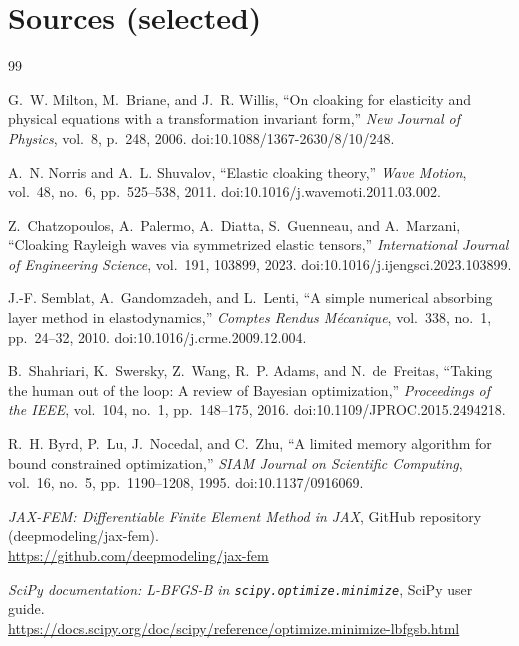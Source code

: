 \documentclass[11pt,a4paper]{report}
\begin{document}
\chapter{Sources (selected)}
\vspace{-0.5em}
\begin{thebibliography}{99}

G.~W. Milton, M.~Briane, and J.~R. Willis,
``On cloaking for elasticity and physical equations with a transformation invariant form,''
\emph{New Journal of Physics}, vol.~8, p.~248, 2006. doi:10.1088/1367-2630/8/10/248.

A.~N. Norris and A.~L. Shuvalov,
``Elastic cloaking theory,''
\emph{Wave Motion}, vol.~48, no.~6, pp.~525--538, 2011. doi:10.1016/j.wavemoti.2011.03.002.

Z.~Chatzopoulos, A.~Palermo, A.~Diatta, S.~Guenneau, and A.~Marzani,
``Cloaking Rayleigh waves via symmetrized elastic tensors,''
\emph{International Journal of Engineering Science}, vol.~191, 103899, 2023. doi:10.1016/j.ijengsci.2023.103899.

J.-F. Semblat, A.~Gandomzadeh, and L.~Lenti,
``A simple numerical absorbing layer method in elastodynamics,''
\emph{Comptes Rendus M\'ecanique}, vol.~338, no.~1, pp.~24--32, 2010. doi:10.1016/j.crme.2009.12.004.

B.~Shahriari, K.~Swersky, Z.~Wang, R.~P. Adams, and N.~de~Freitas,
``Taking the human out of the loop: A review of Bayesian optimization,''
\emph{Proceedings of the IEEE}, vol.~104, no.~1, pp.~148--175, 2016. doi:10.1109/JPROC.2015.2494218.

R.~H. Byrd, P.~Lu, J.~Nocedal, and C.~Zhu,
``A limited memory algorithm for bound constrained optimization,''
\emph{SIAM Journal on Scientific Computing}, vol.~16, no.~5, pp.~1190--1208, 1995. doi:10.1137/0916069.

\emph{JAX-FEM: Differentiable Finite Element Method in JAX}, GitHub repository (deepmodeling/jax-fem).\\
\url{https://github.com/deepmodeling/jax-fem}

\emph{SciPy documentation: L-BFGS-B in \texttt{scipy.optimize.minimize}}, SciPy user guide.\\
\url{https://docs.scipy.org/doc/scipy/reference/optimize.minimize-lbfgsb.html}

\end{thebibliography}
\end{document}
